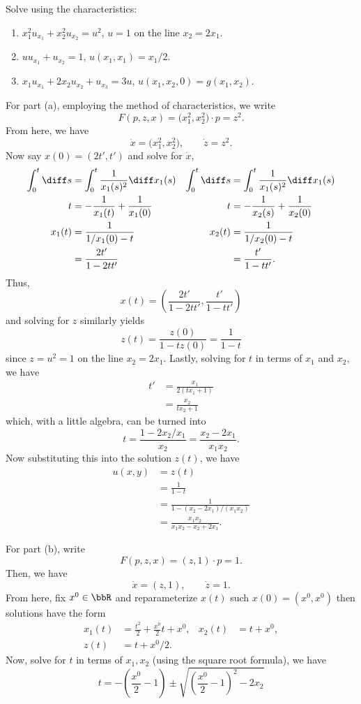 \begin{problem}
  Solve using the characteristics:
  \begin{enumerate}[label=(\alph*)]
  \item \(x_1^2u_{x_1}+x_2^2u_{x_2}=u^2\), \(u=1\) on the line
    \(x_2=2x_1\).
  \item \(uu_{x_1}+u_{x_2}=1\), \(u(x_1,x_1)=x_1/2\).
  \item \(x_1u_{x_1}+2x_2u_{x_2}+u_{x_3}=3u\),
    \(u(x_1,x_2,0)=g(x_1,x_2)\).
  \end{enumerate}
\end{problem}
\begin{solution}
  For part (a), employing the method of characteristics, we write
  \[
    F(p,z,x)=\bigl(x_1^2,x_2^2\bigr)\cdot p=z^2.
  \]
  From here, we have
  \[
    \dot x=\bigl(x_1^2,x_2^2\bigr),\qquad
    \dot z= z^2.
  \]
  Now say \(x(0)=(2t',t')\) and solve for \(\dot x\),
  \begin{align*}
    \int_0^{t}\diff s&=\int_0^t\frac{1}{x_1(s)^2}\diff x_1(s)
    &\int_0^t\diff s&=\int_0^t\frac{1}{x_1(s)^2}\diff x_1(s)\\
    t&=-\frac{1}{x_1(t)}+\frac{1}{x_1(0)}
    &t&=-\frac{1}{x_2(s)}+\frac{1}{x_2(0)}\\
    x_1(t)&=\frac{1}{1/x_1(0)-t}
    &x_2(t)&=\frac{1}{1/x_2(0)-t}\\
    &=\frac{2t'}{1-2tt'}&
    &=\frac{t'}{1-tt'}.
  \end{align*}
  Thus,
  \[
    x(t)=\left(\frac{2t'}{1-2tt'},\frac{t'}{1-tt'}\right)
  \]
  and solving for \(z\) similarly yields
  \[
    z(t)=\frac{z(0)}{1-tz(0)}=\frac{1}{1-t}
  \]
  since \(z=u^2=1\) on the line \(x_2=2x_1\). Lastly, solving for \(t\) in
  terms of \(x_1\) and \(x_2\), we have
  \begin{align*}
    t'&=\frac{x_1}{2(tx_1+1)}\\
      &=\frac{x_2}{tx_2+1}
  \end{align*}
  which, with a little algebra, can be turned into
  \[
    t=\frac{1-2x_2/x_1}{x_2}=\frac{x_2-2x_1}{x_1x_2}.
  \]
  Now substituting this into the solution \(z(t)\), we have
  \begin{align*}
    u(x,y)&=z(t)\\
          &=\frac{1}{1-t}\\
          &=\frac{1}{1-(x_2-2x_1)/(x_1x_2)}\\
          &=\frac{x_1x_2}{x_1x_2-x_2+2x_1}.
  \end{align*}

  For part (b), write
  \[
    F(p,z,x)=\left(z,1\right)\cdot p=1.
  \]
  Then, we have
  \[
    \dot x=\left(z,1\right),\qquad\dot z=1.
  \]
  From here, fix \(x^0\in\bbR\) and reparameterize \(x(t)\) such
  \(x(0)=(x^0,x^0)\) then solutions have the form
  \begin{align*}
    x_1(t)&=\frac{t^2}{2}+\frac{x^0}{2}t+x^0,
    &x_2(t)&=t+x^0,\\
    z(t)&=t+x^0/2.
  \end{align*}
  Now, solve for \(t\) in terms of \(x_1,x_2\) (using the square root
  formula), we have
  \[
    t=-\left(\frac{x^0}{2}-1\right)\pm\sqrt{\left(\frac{x^0}{2}-1\right)^2-2x_2}
  \]



\end{solution}
